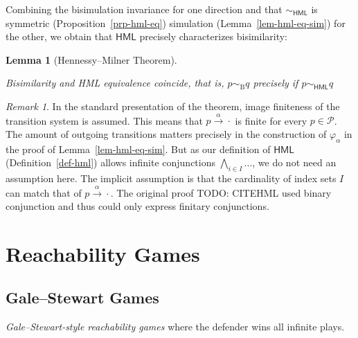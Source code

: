 \documentclass[
  a4paper,
]{report}
\theoremstyle{plain}
\theoremstyle{plain}
\theoremstyle{definition}
\theoremstyle{plain}
\newtheorem{lemma}{Lemma}[section]
\theoremstyle{definition}
\theoremstyle{remark}
\newtheorem{refremark}{Remark}[section]
\begin{document}
Combining the bisimulation invariance for one direction and that
\(\sim_\mathrm{\textsf{HML}}\) is symmetric
(Proposition~\ref{prp-hml-eq}) simulation (Lemma~\ref{lem-hml-eq-sim})
for the other, we obtain that \(\textsf{HML}\) precisely characterizes
bisimilarity:

\begin{lemma}[Hennessy--Milner
Theorem]\protect\hypertarget{lem-hennessy-milner}{}\label{lem-hennessy-milner}

Bisimilarity and HML equivalence coincide, that is,
\(p \sim_\mathrm{B} q\) precisely if \(p \sim_\mathrm{\textsf{HML}} q\)

\end{lemma}

\begin{refremark}
In the standard presentation of the theorem, image finiteness of the
transition system is assumed. This means that
\(p \xrightarrow{α} \cdot\) is finite for every \(p \in \mathcal{P}\).
The amount of outgoing transitions matters precisely in the construction
of \(φ_α\) in the proof of Lemma~\ref{lem-hml-eq-sim}. But as our
definition of \(\textsf{HML}\) (Definition~\ref{def-hml}) allows
infinite conjunctions \(\textstyle\bigwedge_{i \in I} …\), we do not
need an assumption here. The implicit assumption is that the cardinality
of index sets \(I\) can match that of \(p \xrightarrow{α} \cdot\). The
original proof TODO: CITEHML used binary conjunction and thus could only
express finitary conjunctions.

\label{rem-image-finiteness}

\end{refremark}

\section{Reachability Games}\label{reachability-games}

\subsection{Gale--Stewart Games}\label{galestewart-games}

\emph{Gale--Stewart-style reachability games} where the defender wins
all infinite plays.
\end{document}
